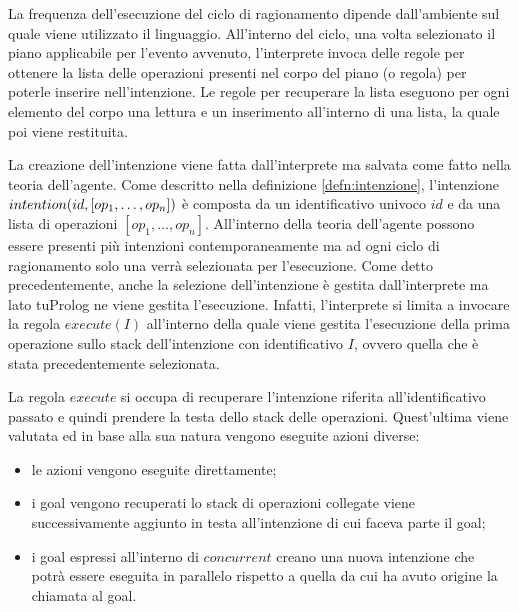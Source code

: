 La frequenza dell'esecuzione del ciclo di ragionamento dipende dall'ambiente sul quale viene utilizzato il linguaggio. All'interno del ciclo, una volta selezionato il piano applicabile per l'evento avvenuto, l'interprete invoca delle regole per ottenere la lista delle operazioni presenti nel corpo del piano (o regola) per poterle inserire nell'intenzione. Le regole per recuperare la lista eseguono per ogni elemento del corpo una lettura e un inserimento all'interno di una lista, la quale poi viene restituita.

La creazione dell'intenzione viene fatta dall'interprete ma salvata come fatto nella teoria dell'agente. Come descritto nella definizione \ref{defn:intenzione}, l'intenzione $in\-ten\-tion(id,[op_1, \ldots, op_n])$ è composta da un identificativo univoco $id$ e da una lista di operazioni $[op_1, \ldots, op_n]$. All'interno della teoria dell'agente possono essere presenti più intenzioni contemporaneamente ma ad ogni ciclo di ragionamento solo una verrà selezionata per l'esecuzione.
Come detto precedentemente, anche la selezione dell'intenzione è gestita dall'interprete ma lato tuProlog ne viene gestita l'esecuzione. Infatti, l'interprete si limita a invocare la regola $execute(I)$ all'interno della quale viene gestita l'esecuzione della prima operazione sullo stack dell'intenzione con identificativo $I$, ovvero quella che è stata precedentemente selezionata.

La regola $execute$ si occupa di recuperare l'intenzione riferita all'identificativo passato e quindi prendere la testa dello stack delle operazioni. Quest'ultima viene valutata ed in base alla sua natura vengono eseguite azioni diverse:
\begin{itemize}
\item le azioni vengono eseguite direttamente;
\item i goal vengono recuperati lo stack di operazioni collegate viene successivamente aggiunto in testa all'intenzione di cui faceva parte il goal;
\item i goal espressi all'interno di $concurrent$ creano una nuova intenzione che potrà essere eseguita in parallelo rispetto a quella da cui ha avuto origine la chiamata al goal.
\end{itemize}


